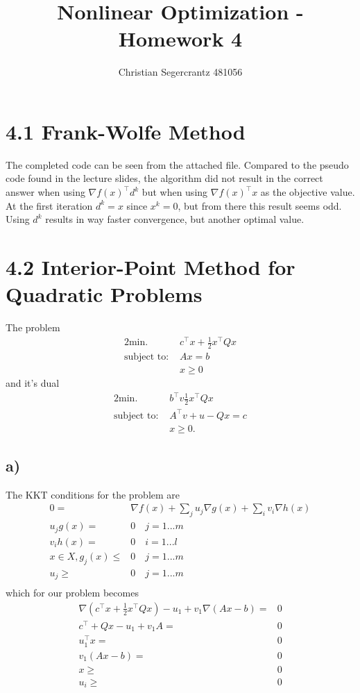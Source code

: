 \documentclass{article}
\title{Nonlinear Optimization - Homework 4}
\author{Christian Segercrantz 481056}
\begin{document}
	\maketitle
	\pagebreak
\section*{4.1 Frank-Wolfe Method}
	The completed code can be seen from the attached file. Compared to the pseudo code found in the lecture slides, the algorithm did not result in the correct answer when using $\nabla f(x)^\top d^k$ but when using $\nabla f(x)^\top x$ as the objective value. At the first iteration $d^k=x$ since $x^k=0$, but from there this result seems odd. Using $d^k$ results in way faster convergence, but another optimal value.
\section*{4.2 Interior-Point Method for Quadratic Problems}
	The problem
	\begin{alignat}{2}
		\text{min. } & c^\top x + \frac{1}{2}x^\top Q x \\
		\text{subject to: } & Ax = b \label{eq:4.1_g1_primal}\\
		&x \geq 0
	\end{alignat}
	and it's dual
	\begin{alignat}{2}
		\text{min. } & b^\top v \frac{1}{2}x^\top Q x \\
		\text{subject to: } & A^\top v + u - Qx = c \label{eq:4.1_g1_dual}\\
		&x \geq 0.
	\end{alignat}
\subsection*{a)}
	The KKT conditions for the problem are
	\begin{align}
		0=& \nabla f(x) + \sum_j u_j \nabla g(x) + \sum_i v_i\nabla h(x) \\
		u_jg(x) =& 0 \quad j=1...m \\
		v_ih(x) =& 0 \quad i=1...l \\
		x\in X, g_j(x)\leq& 0 \quad j=1...m \\
		u_j\geq& 0 \quad j=1...m \\
	\end{align}
	which for our problem becomes
	\begin{align}
		\nabla (c^\top x + \frac{1}{2}x^\top Q x) - u_1 + v_1 \nabla(Ax-b) =& 0\\
		c^\top+Qx - u_1 + v_1A =& 0 \\
		u_1^\top x =& 0 \\
		v_1(Ax-b) =& 0  \\
		x \geq& 0 \\
		u_i\geq& 0  \\
	\end{align}
\end{document}
